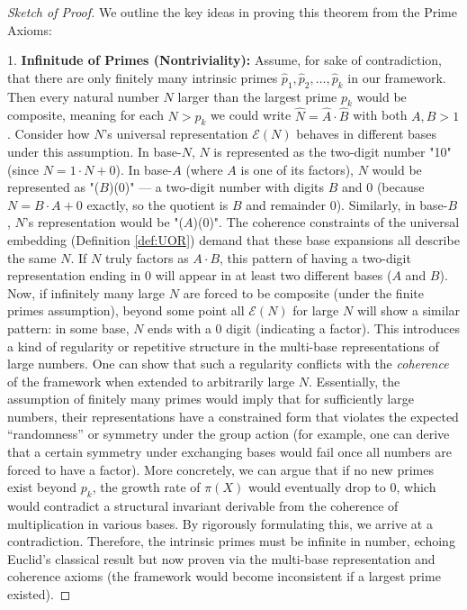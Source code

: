 \documentclass[11pt]{article}
\begin{document}
\begin{proof}[Sketch of Proof]
We outline the key ideas in proving this theorem from the Prime Axioms:

1. \textbf{Infinitude of Primes (Nontriviality):} Assume, for sake of contradiction, that there are only finitely many intrinsic primes $\hat{p}_1, \hat{p}_2, \dots, \hat{p}_k$ in our framework. Then every natural number $N$ larger than the largest prime $p_k$ would be composite, meaning for each $N > p_k$ we could write $\hat{N} = \widehat{A}\cdot \widehat{B}$ with both $A, B > 1$. Consider how $N$’s universal representation $\mathcal{E}(N)$ behaves in different bases under this assumption. In base-$N$, $N$ is represented as the two-digit number "10" (since $N = 1 \cdot N + 0$). In base-$A$ (where $A$ is one of its factors), $N$ would be represented as "($B$)(0)" — a two-digit number with digits $B$ and $0$ (because $N = B \cdot A + 0$ exactly, so the quotient is $B$ and remainder $0$). Similarly, in base-$B$, $N$'s representation would be "($A$)(0)". The coherence constraints of the universal embedding (Definition \ref{def:UOR}) demand that these base expansions all describe the same $N$. If $N$ truly factors as $A\cdot B$, this pattern of having a two-digit representation ending in 0 will appear in at least two different bases ($A$ and $B$). Now, if infinitely many large $N$ are forced to be composite (under the finite primes assumption), beyond some point all $\mathcal{E}(N)$ for large $N$ will show a similar pattern: in some base, $N$ ends with a 0 digit (indicating a factor). This introduces a kind of regularity or repetitive structure in the multi-base representations of large numbers. One can show that such a regularity conflicts with the \emph{coherence} of the framework when extended to arbitrarily large $N$. Essentially, the assumption of finitely many primes would imply that for sufficiently large numbers, their representations have a constrained form that violates the expected “randomness” or symmetry under the group action (for example, one can derive that a certain symmetry under exchanging bases would fail once all numbers are forced to have a factor). More concretely, we can argue that if no new primes exist beyond $p_k$, the growth rate of $\pi(X)$ would eventually drop to 0, which would contradict a structural invariant derivable from the coherence of multiplication in various bases. By rigorously formulating this, we arrive at a contradiction. Therefore, the intrinsic primes must be infinite in number, echoing Euclid’s classical result but now proven via the multi-base representation and coherence axioms (the framework would become inconsistent if a largest prime existed).


\end{proof}
\end{document}
